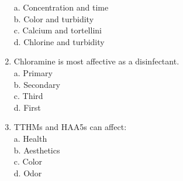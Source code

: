 \begin{enumerate}[1.]
a. Concentration and time\\
b. Color and turbidity\\
c. Calcium and tortellini\\
d. Chlorine and turbidity\\
\item Chloramine is most affective as a disinfectant.\\
a. Primary\\
b. Secondary\\
c. Third\\
d. First\\
\item TTHMs and HAA5s can affect:\\
a. Health\\
b. Aesthetics\\
c. Color\\
d. Odor\\

\end{enumerate}




